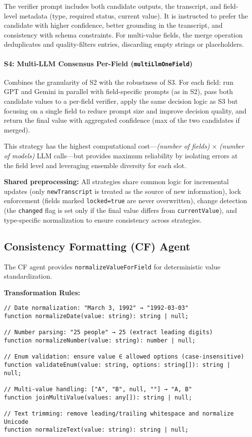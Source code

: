 The verifier prompt includes both candidate outputs, the transcript, and field-level metadata (type, required status, current value). It is instructed to prefer the candidate with higher confidence, better grounding in the transcript, and consistency with schema constraints. For multi-value fields, the merge operation deduplicates and quality-filters entries, discarding empty strings or placeholders.

\paragraph{S4: Multi-LLM Consensus Per-Field (\texttt{multiLlmOneField})}
Combines the granularity of S2 with the robustness of S3. For each field: run GPT and Gemini in parallel with field-specific prompts (as in S2), pass both candidate values to a per-field verifier, apply the same decision logic as S3 but focusing on a single field to reduce prompt size and improve decision quality, and return the final value with aggregated confidence (max of the two candidates if merged).

This strategy has the highest computational cost—\textit{(number of fields)} × \textit{(number of models)} LLM calls—but provides maximum reliability by isolating errors at the field level and leveraging ensemble diversity for each slot.

\textbf{Shared preprocessing:} All strategies share common logic for incremental updates (only \texttt{newTranscript} is treated as the source of new information), lock enforcement (fields marked \texttt{locked=true} are never overwritten), change detection (the \texttt{changed} flag is set only if the final value differs from \texttt{currentValue}), and type-specific normalization to ensure consistency across strategies.

\subsection{Consistency Formatting (CF) Agent}
\label{subsec:impl-cf}

The CF agent provides \texttt{normalizeValueForField} for deterministic value standardization.

\textbf{Transformation Rules:}
\begin{verbatim}
// Date normalization: "March 3, 1992" → "1992-03-03"
function normalizeDate(value: string): string | null;

// Number parsing: "25 people" → 25 (extract leading digits)
function normalizeNumber(value: string): number | null;

// Enum validation: ensure value ∈ allowed options (case-insensitive)
function validateEnum(value: string, options: string[]): string | null;

// Multi-value handling: ["A", "B", null, ""] → "A, B"
function joinMultiValue(values: any[]): string | null;

// Text trimming: remove leading/trailing whitespace and normalize Unicode
function normalizeText(value: string): string | null;
\end{verbatim}

